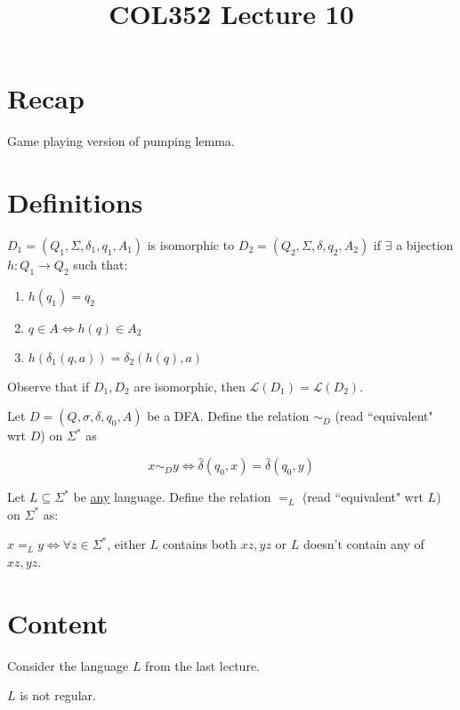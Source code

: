 \documentclass[a4paper]{article}
\title{\textbf{COL352 Lecture 10}}
\date{}
\newcommand{\nl}{\vspace{0.2cm}\\}
\newcommand{\mc}{\mathcal}
\renewcommand{\L}{\mc{L}}
\newcommand{\hd}{\hat{\delta}}
\begin{document}
\maketitle
\tableofcontents

\section{Recap}

Game playing version of pumping lemma.

\section{Definitions}

\begin{defn}
    $D_1 = (Q_1, \Sigma, \delta_1, q_1, A_1)$ is isomorphic to $D_2 = (Q_2, \Sigma, \delta, q_2, A_2)$ if $\exists$ a bijection $h : Q_1 \to Q_2$ such that:
    \begin{enumerate}
        \item $h(q_1) = q_2$
        \item $q \in A \iff h(q) \in A_2$
        \item $h(\delta_1(q, a)) = \delta_2(h(q), a)$
    \end{enumerate}
\end{defn}

Observe that if $D_1, D_2$ are isomorphic, then $\L(D_1) = \L(D_2)$.\nl
\begin{defn}
    Let $D = (Q, \sigma, \delta, q_0, A)$ be a DFA. Define the relation $\sim_D$ (read ``equivalent" wrt $D$) on $\Sigma^*$ as

    $$x \sim_D y \iff \hd(q_0, x) = \hd(q_0, y)$$
\end{defn}

\begin{defn}
    Let $L \subseteq \Sigma^*$ be \underline{any} language. Define the relation $=_L$ (read ``equivalent" wrt $L$) on $\Sigma^*$ as:

    $x =_L y \iff \forall z \in \Sigma^*$, either $L$ contains both $xz, yz$ or $L$ doesn't contain any of $xz, yz$.
\end{defn}

\section{Content}

Consider the language $L$ from the last lecture.

\begin{claim}
    $L$ is not regular.
\end{claim}
\end{document}
